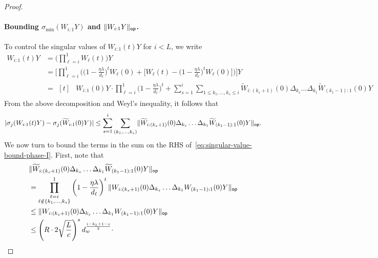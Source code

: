\begin{proof}
  \paragraph{Bounding $\sigma_{\min}(W_{i:1}Y)$ and $\lVert W_{i:1}Y\rVert_{\mathsf{op}}$.}
  To control the singular values of $W_{i:1}(t) Y$ for $i < L$, we write
  \begin{align*}
      W_{i:1}(t) Y &=
      \Big( \prod_{ \ell = i }^{1} W_{\ell}(t)
      \Big) Y \\
      &=
      \bigg[ \prod_{\ell = i}^{1} 
      \bigg( \Big(1 - \frac{\eta \lambda}{d_{\ell}}\Big)^{t} W_{\ell}(0) +
      \Big[ W_{\ell}(t) - \Big(1 - \frac{\eta \lambda}{d_{\ell}}\Big)^{t} W_{\ell}(0)
      \Big] \bigg) \bigg] Y \\
      &=
      \begin{aligned}[t]
        & W_{i:1}(0) Y \cdot
        \prod_{\ell = i}^{1} \Big(1 - \frac{\eta \lambda}{d_{\ell}}\Big)^{t}  +
        \sum_{s = 1}^{i}
        \sum_{1 \leq k_{1}, \dots, k_{s} \leq i}
        \widetilde{W}_{i:(k_{s}+1)}(0)
        \Delta_{k_{s}} \dots \Delta_{k_1}
        \widetilde{W}_{(k_1 - 1):1}(0) Y
      \end{aligned}
  \end{align*}
  From the above decomposition and Weyl's inequality, it follows that
  \begin{equation}
      \lvert\sigma_{j}(W_{i:1}(t) Y) - \sigma_{j}(\widetilde{W}_{i:1}(0) Y)\rvert
      \leq \sum_{s = 1}^{i} \sum_{(k_1, \dots, k_{s})} \lVert
        \widetilde{W}_{i:(k_{s}+1)}(0)
        \Delta_{k_{s}} \dots \Delta_{k_1}
        \widetilde{W}_{(k_{1} - 1):1}(0) Y
      \rVert_{\mathsf{op}}.
      \label{eq:singular-value-bound-phase-I}
  \end{equation}
  We now turn to bound the terms in the sum on the RHS of~\eqref{eq:singular-value-bound-phase-I}.
  First, note that
  \begin{align*}
    &\opnorm{
      \widetilde{W}_{i:(k_{s}+1)}(0)
      \Delta_{k_{s}} \dots \Delta_{k_1}
      \widetilde{W}_{(k_{1} - 1):1}(0) Y
    }\\
    &=
    \prod_{\substack{\ell = i\\\ell \notin \set{k_1, \dots, k_{s}}}}^{1}
    \left(1 - \frac{\eta \lambda}{d_{\ell}}\right)^{t}
    \opnorm{
      W_{i:(k_{s}+1)}(0) \Delta_{k_{s}} \dots \Delta_{k_{1}} W_{(k_{1} - 1):1}(0) Y
    } \\
    &\leq
    \opnorm{W_{i:(k_{s}+1)}(0) \Delta_{k_{s}} \dots \Delta_{k_{1}} W_{(k_{1}-1):1}(0) Y} \\
    &\leq
    \left(R \cdot 2 \sqrt{\frac{L}{c}}\right)^{s} \dhid^{\frac{i - k_{1} + 1 - s}{2}} \cdot

\end{align*}
\end{proof}
